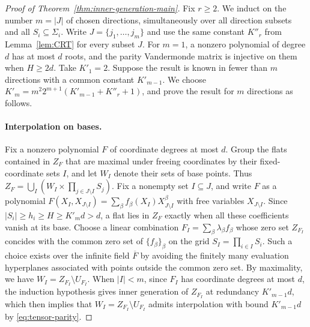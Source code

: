 \documentclass[10pt,a4paper]{amsart}
\theoremstyle{plain}
\theoremstyle{definition}
\theoremstyle{remark}
\begin{document}
\begin{proof}[Proof of Theorem~\ref{thm:inner-generation-main}]
Fix $r \ge 2$. We induct on the number $m = |J|$ of chosen directions, simultaneously
over all direction subsets and all $S_i\subseteq\Sigma_i$.
Write $J=\{j_1,\ldots,j_m\}$ and use the same constant $K''_r$
from Lemma~\ref{lem:CRT} for every subset $J$.
For $m=1$, a nonzero polynomial of degree $d$ has at most $d$
roots, and the parity Vandermonde matrix is injective on them
when $H\ge2d$. Take $K'_1=2$.
Suppose the result is known in fewer than $m$ directions with
a common constant $K'_{m-1}$. We choose $K'_m = m^2 2^{m+1}(K'_{m-1}+K''_r+1)$, and prove the result for $m$ directions as follows.

\paragraph{Interpolation on bases.}
Fix a nonzero polynomial \(F\) of coordinate degrees at most \(d\).
Group the flats contained in \(Z_F\) that are maximal under
freeing coordinates by their fixed-coordinate sets \(I\), and let
\(W_I\) denote their sets of base points. Thus
$Z_F=\bigcup_I(W_I\times\prod_{j \in J \setminus I}S_j)$.
Fix a nonempty set \(I\subseteq J\), and write $F$ as a polynomial \(F(X_I,X_{J \setminus I})=\sum_\beta f_\beta(X_I)X_{J \setminus I}^{\beta}\) with free variables $X_{J \setminus I}$. 
Since $|S_i|\ge h_i\ge H\ge K'_m d>d$, a flat lies in $Z_F$
exactly when all these coefficients vanish at its base.
Choose a linear combination \(F_I=\sum_\beta\lambda_\beta f_\beta\) whose zero set $Z_{F_I}$ concides with the common zero set of $\{f_\beta\}_\beta$ on the grid \(S_I = \prod_{i \in I} S_i\). Such a choice exists over the infinite field $\overline{F}$ by avoiding the finitely many evaluation hyperplanes associated with points outside the common zero set.
By maximality, we have  $W_I=Z_{F_I}\setminus U_{F_I}$.
When $|I|<m$, since $F_I$ has coordinate degrees at most $d$, the induction hypothesis gives inner generation of $Z_{F_I}$ at redundancy $K'_{m-1}d$, which then implies that $W_I=Z_{F_I}\setminus U_{F_I}$ admits interpolation with bound $K'_{m-1}d$ by \eqref{eq:tensor-parity}.


\end{proof}
\end{document}

